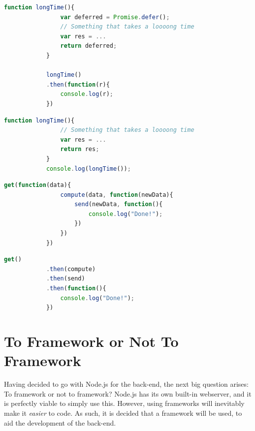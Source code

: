 		\begin{lstlisting}[language=Javascript,gobble=12,caption={Using promises, in Node.js},label={lst:node:promise}]
            function longTime(){
                var deferred = Promise.defer();
                // Something that takes a loooong time
                var res = ...
                return deferred;
            }
            
            longTime()
            .then(function(r){
                console.log(r);
            })
		\end{lstlisting}

		\begin{lstlisting}[language=Javascript,gobble=12,caption={The wrong way to do it, in Node.js},label={lst:node:wrong}]
            function longTime(){
                // Something that takes a loooong time
                var res = ...
                return res;
            }
            console.log(longTime());
		\end{lstlisting}
		

		\begin{lstlisting}[language=Javascript,gobble=12,caption={Chaining data between callbacks in node.js},label={lst:node:callbackhell}]
            get(function(data){
                compute(data, function(newData){
                    send(newData, function(){
                        console.log("Done!");
                    })
                })
            })
		\end{lstlisting}
		
		\begin{lstlisting}[language=Javascript,gobble=12,caption={Chaining data between promises in node.js},label={lst:node:promisegoodness}]
            get()
            .then(compute)
            .then(send)
            .then(function(){
                console.log("Done!");
            })
		\end{lstlisting}

	\section{To Framework or Not To Framework}
		Having decided to go with Node.js for the back-end, the next big question arises: To framework or not to framework? Node.js has its own built-in webserver, and it is perfectly viable to simply use this. However, using frameworks will inevitably make it \emph{easier} to code. As such, it is decided that a framework will be used, to aid the development of the back-end.

